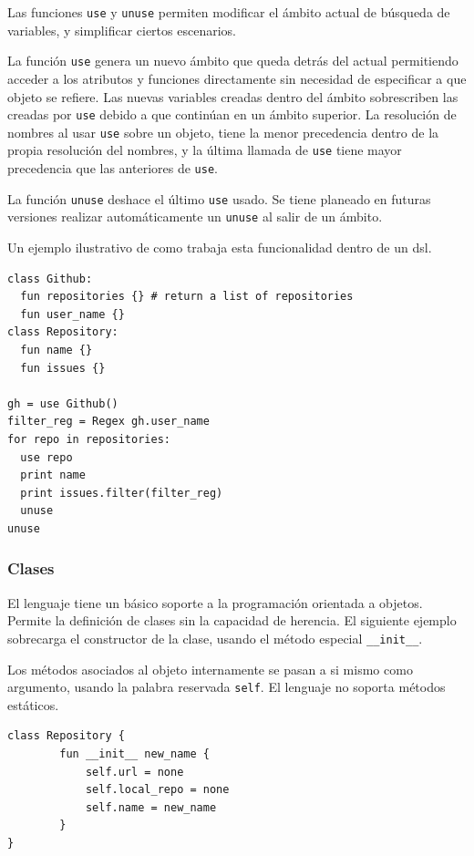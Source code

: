 \documentclass[11pt]{article}
\begin{document}
Las funciones \texttt{use} y \texttt{unuse} permiten modificar el ámbito actual de búsqueda de variables, y simplificar ciertos escenarios.

La función \texttt{use} genera un nuevo ámbito que queda detrás del actual permitiendo acceder a los atributos y funciones directamente
sin necesidad de especificar a que objeto se refiere. Las nuevas
variables creadas dentro del ámbito sobrescriben las creadas por \texttt{use}
debido a que continúan en un ámbito superior. La resolución de nombres al usar \texttt{use} sobre un objeto, tiene la menor precedencia
dentro de la propia resolución del nombres, y la última llamada de \texttt{use} tiene mayor precedencia que las anteriores de \texttt{use}.

La función \texttt{unuse} deshace el último \texttt{use} usado. Se tiene planeado en futuras versiones realizar automáticamente un \texttt{unuse} al salir de un ámbito.

Un ejemplo ilustrativo de como trabaja esta funcionalidad dentro de un \gls{dsl}.

\begin{verbatim}
class Github:
  fun repositories {} # return a list of repositories
  fun user_name {}
class Repository:
  fun name {}
  fun issues {}

gh = use Github()
filter_reg = Regex gh.user_name
for repo in repositories:
  use repo
  print name
  print issues.filter(filter_reg)
  unuse
unuse
\end{verbatim}

\subsubsection{Clases}
\label{sec:org4c6d352}
El lenguaje tiene un básico soporte a la programación orientada a objetos. Permite la definición
de clases sin la capacidad de herencia. El siguiente ejemplo sobrecarga el constructor de la clase,
usando el método especial \texttt{\_\_init\_\_}.

Los métodos asociados al objeto internamente se pasan a si mismo como argumento, usando la palabra
reservada \texttt{self}. El lenguaje no soporta métodos estáticos.


\begin{verbatim}
class Repository {
        fun __init__ new_name {
            self.url = none
            self.local_repo = none
            self.name = new_name
        }
}
\end{verbatim}
\end{document}
